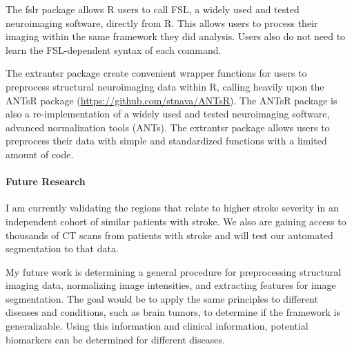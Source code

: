\documentclass[12pt,a4paper]{article}
\begin{document}
The fslr package allows R users to call FSL, a widely used and tested neuroimaging software, directly from R.  This allows users to process their imaging within the same framework they did analysis.  Users also do not need to learn the FSL-dependent syntax of each command.  

The extrantsr package create convenient wrapper functions for users to preprocess structural neuroimaging data within R, calling heavily upon the ANTsR package (\url{https://github.com/stnava/ANTsR}).  The ANTsR package is also a re-implementation of a widely used and tested neuroimaging software, advanced normalization tools (ANTs).  The extrantsr package allows users to preprocess their data with simple and standardized functions with a limited amount of code. 

\paragraph{Future Research} I am currently validating the regions that relate to higher stroke severity in an independent cohort of similar patients with stroke.  We also are gaining access to thousands of CT scans from patients with stroke and will test our automated segmentation to that data. 

My future work is determining a general procedure for preprocessing structural imaging data, normalizing image intensities, and extracting features for image segmentation. The goal would be to apply the same principles to different diseases and conditions, such as brain tumors, to determine if the framework is generalizable.  Using this information and clinical information, potential biomarkers can be determined for different diseases. 
\end{document}
